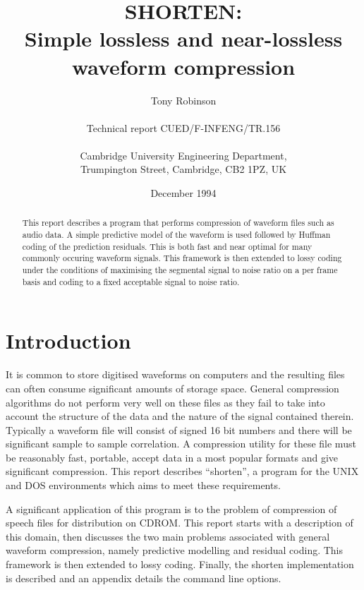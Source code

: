 
\def\baselinestretch{0.95}
\title{{\Large SHORTEN:} \\
Simple lossless and near-lossless waveform compression}
\author{Tony Robinson \\
\\
Technical report {\sc CUED/F-INFENG/TR.156} \\
\\
Cambridge University Engineering Department, \\
Trumpington Street, Cambridge, CB2 1PZ, UK}
\date{December 1994}
\maketitle

\begin{abstract}

This report describes a program that performs compression of waveform
files such as audio data.  A simple predictive model of the waveform is
used followed by Huffman coding of the prediction residuals.  This is
both fast and near optimal for many commonly occuring waveform signals.
This framework is then extended to lossy coding under the conditions of
maximising the segmental signal to noise ratio on a per frame basis and
coding to a fixed acceptable signal to noise ratio.

\end{abstract}

\section{Introduction}

It is common to store digitised waveforms on computers and the resulting
files can often consume significant amounts of storage space.  General
compression algorithms do not perform very well on these files as they
fail to take into account the structure of the data and the nature of
the signal contained therein.  Typically a waveform file will consist of
signed 16 bit numbers and there will be significant sample to sample
correlation.  A compression utility for these file must be reasonably
fast, portable, accept data in a most popular formats and give
significant compression.  This report describes ``shorten'', a program
for the UNIX and DOS environments which aims to meet these requirements.

A significant application of this program is to the problem of
compression of speech files for distribution on CDROM.  This report
starts with a description of this domain, then discusses the two main
problems associated with general waveform compression, namely predictive
modelling and residual coding.  This framework is then extended to lossy
coding.  Finally, the shorten implementation is described and an
appendix details the command line options.

